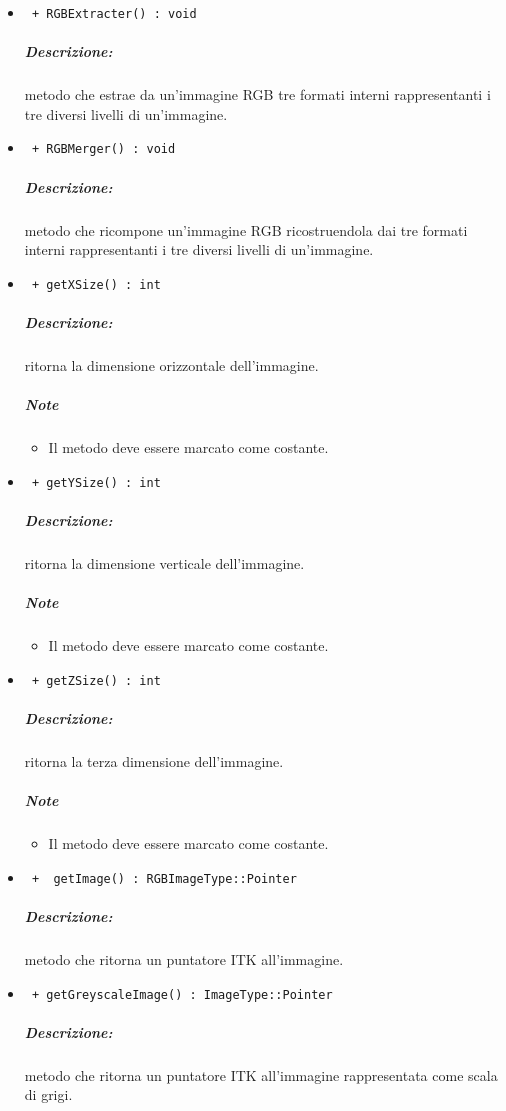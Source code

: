 \begin{itemize}
		\item \color{blue}\verb! + RGBExtracter() : void! 
		\color{black}
		\subparagraph{Descrizione:} metodo che estrae da un'immagine RGB tre formati interni rappresentanti i tre diversi livelli di un'immagine.
		
		\item \color{blue}\verb! + RGBMerger() : void! 
		\color{black}
		\subparagraph{Descrizione:} metodo che ricompone un'immagine RGB ricostruendola dai tre formati interni rappresentanti i tre diversi livelli di un'immagine.
		
	\item \color{blue}\verb! + getXSize() : int !\\
	\color{black}
	\subparagraph{Descrizione: } ritorna la dimensione orizzontale dell'immagine.
	\subparagraph{Note}
		\begin{itemize}
			\item Il metodo deve essere marcato come costante.
		\end{itemize}
		
	\item \color{blue}\verb! + getYSize() : int !\\
	\color{black}
	\subparagraph{Descrizione: } ritorna la dimensione verticale dell'immagine.
	\subparagraph{Note}
		\begin{itemize}
			\item Il metodo deve essere marcato come costante.
		\end{itemize}
	
	\item \color{blue}\verb! + getZSize() : int!\\
	\color{black}
	\subparagraph{Descrizione:} ritorna la terza  dimensione dell'immagine.
	\subparagraph{Note}
		\begin{itemize}
			\item Il metodo deve essere marcato come costante.
		\end{itemize}
		
	\item \color{blue}\verb! +  getImage() : RGBImageType::Pointer!\\
	\color{black}
	\subparagraph{Descrizione:} metodo che ritorna un puntatore ITK\g{} all'immagine.
	
	\item \color{blue}\verb! + getGreyscaleImage() : ImageType::Pointer!\\
	\color{black}
	\subparagraph{Descrizione:} metodo che ritorna un puntatore ITK\g{} all'immagine rappresentata come scala di grigi.
	

\end{itemize}
